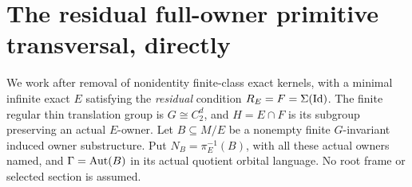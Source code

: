 \section{The residual full-owner primitive transversal, directly}
\label{sec:primitive-transversal}
\label{sec:consolidated-owner}

We work after removal of nonidentity finite-class exact kernels,
with a minimal infinite exact $E$ satisfying the \emph{residual}
condition $R_E=F=\Sigma(\mathrm{Id})$.  The finite regular thin
translation group is $G\cong C_2^d$, and $H=E\cap F$ is its
subgroup preserving an actual $E$-owner.  Let
$B\subseteq M/E$ be a nonempty finite $G$-invariant induced
owner substructure.  Put $N_B=\pi_E^{-1}(B)$, with all these
actual owners named, and $\Gamma=\operatorname{Aut}(B)$ in its actual
quotient orbital language.  No root frame or selected section
is assumed.

